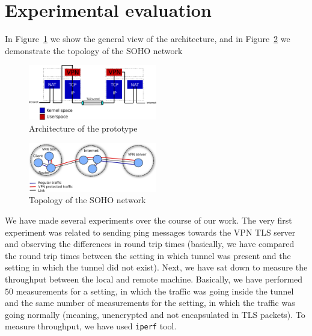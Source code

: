 \section{Experimental evaluation}
\label{section:experiments}

In Figure~\ref{fig:arch} we show the general view of the architecture, 
and in Figure~\ref{fig:topo} we demonstrate the topology of the SOHO network

\begin{figure}[!h]
        \includegraphics[width=0.5\textwidth]{graphics/architecture.png}
        \caption{Architecture of the prototype}
        \label{fig:arch}
\end{figure}


\begin{figure}[!h]
        \includegraphics[width=0.5\textwidth]{graphics/topology.png}
        \caption{Topology of the SOHO network}
        \label{fig:topo}
\end{figure}


We have made several experiments over the course of our work. The very first experiment was 
related to sending ping messages towards the VPN TLS server and observing the differences in
round trip times (basically, we have compared the round trip times between the setting in 
which tunnel was present and the setting in which the tunnel did not exist). Next, we have
sat down to measure the throughput between the local and remote machine. Basically, we have 
performed $50$ measurements for a setting, in which the traffic was going inside the tunnel
and the same number of measurements for the setting, in which the traffic was going 
normally (meaning, unencrypted and not encapsulated in TLS packets). To measure throughput,
we have used \texttt{iperf} tool.

